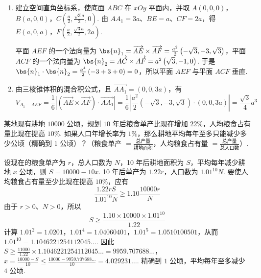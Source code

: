 \begin{solution}
\begin{enumerate}
\item 建立空间直角坐标系，使底面 \(ABC\) 在 \(xOy\) 平面内，并取 \(A\left(0,0,0\right)\)，\(B\left(a,0,0\right)\)，\(C\left(\frac{a}{2},\frac{\sqrt{3}a}{2},0\right)\). 由 \(AA_1=3a\)、\(BE=a\)、\(CF=2a\)，得 \(E\left(a,0,a\right)\)，\(F\left(\frac{a}{2},\frac{\sqrt{3}a}{2},2a\right)\).

平面 \(AEF\) 的一个法向量为 \(\bs{n}_1=\overrightarrow{AE}\times\overrightarrow{AF}=\frac{a^2}{2}\left(-\sqrt{3},-3,\sqrt{3}\right)\)，平面 \(ACF\) 的一个法向量为 \(\bs{n}_2=\overrightarrow{AC}\times\overrightarrow{AF}=a^2\left(\sqrt{3},-1,0\right)\). 于是 \(\bs{n}_1\cdot\bs{n}_2=\frac{a^4}{2}\left(-3+3+0\right)=0\)，所以平面 \(AEF\) 与平面 \(ACF\) 垂直.

\item 由三棱锥体积的混合积公式，且 \(\overrightarrow{AA_1}=\left(0,0,3a\right)\)，有
\[
V_{A_1-AEF}=\frac{1}{6}\left|\left(\overrightarrow{AE}\times\overrightarrow{AF}\right)\cdot\overrightarrow{AA_1}\right|=\frac{1}{6}\left|\frac{a^2}{2}\left(-\sqrt{3},-3,\sqrt{3}\right)\cdot\left(0,0,3a\right)\right|=\frac{\sqrt{3}}{4}a^3
\]
\end{enumerate}
\end{solution}

\begin{problem}
某地现有耕地 \(10000\text{ 公顷}\)，规划 \(10\text{ 年}\)后粮食单产比现在增加 \(22\%\)，人均粮食占有量比现在提高 \(10\%\). 如果人口年增长率为 \(1\%\)，那么耕地平均每年至多只能减少多少公顷（精确到 \(1\text{ 公顷}\)）？（粮食单产 \(= \frac{\text{总产量}}{\text{耕地面积}}\)，人均粮食占有量 \(= \frac{\text{总产量}}{\text{总人口数}}\)）.
\end{problem}

\begin{solution}
设现在的粮食单产为 \(r\)，总人口数为 \(N\)，10 年后耕地面积为 \(S\)，平均每年减少耕地 \(x\) 公顷，则 \(S=10000-10x\). 10 年后单产为 \(1.22r\)，人口数为 \(1.01^{10}N\). 要使人均粮食占有量至少比现在提高 \(10\%\)，应有
\[
\frac{1.22rS}{1.01^{10}N}\geqslant1.10\frac{10000r}{N}
\]
由于 \(r>0\)、\(N>0\)，所以
\[
S\geqslant\frac{1.10\times10000\times1.01^{10}}{1.22}
\]
计算 \(1.01^2=1.0201\)，\(1.01^4=1.04060401\)，\(1.01^5=1.0510100501\)，从而 \(1.01^{10}=1.1046221254112045\ldots\). 因此
\(S\geqslant\frac{11000}{1.22}\times1.1046221254112045\ldots=9959.707688\ldots\)，\(x=\frac{10000-S}{10}\leqslant\frac{10000-9959.707688\ldots}{10}=4.029231\ldots\).
精确到 \(1\) 公顷，平均每年至多减少 \(4\) 公顷.
\end{solution}

